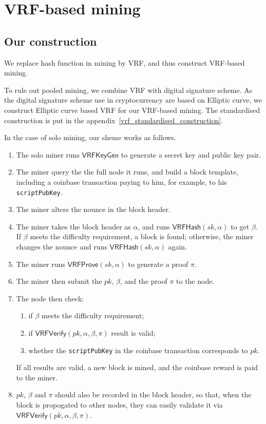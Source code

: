\section{VRF-based mining}

\subsection{Our construction}

We replace hash function in mining by VRF, and thus construct VRF-based mining.

To rule out pooled mining, we combine VRF with digital signature scheme.
As the digital signature scheme use in cryptocurrency are based on Elliptic curve, we construct Elliptic curve based VRF for our VRF-based mining.
The standardised construction is put in the appendix~\ref{vrf_standardised_construction}.


In the case of solo mining, our sheme works as follows.

\begin{enumerate}
    \item The solo miner runs $\mathsf{VRFKeyGen}$ to generate a secret key and public key pair.
    \item The miner query the the full node it runs, and build a block template, including a coinbase transaction paying to him, for example, to his \texttt{scriptPubKey}.
    \item The miner alters the nounce in the block header.
    \item The miner takes the block header as $\alpha$, and runs $\mathsf{VRFHash}(sk, \alpha)$ to get $\beta$. If $\beta$ meets the difficulty requirement, a block is found; otherwise, the miner changes the nounce and runs $\mathsf{VRFHash}(sk, \alpha)$ again.
    \item The miner runs $\mathsf{VRFProve}(sk, \alpha)$ to generate a proof $\pi$.
    \item The miner then submit the $pk$, $\beta$, and the proof $\pi$ to the node.
    \item The node then check:
        \begin{enumerate}
            \item if $\beta$ meets the difficulty requirement;
            \item if $\mathsf{VRFVerify}(pk, \alpha, \beta, \pi)$ result is valid;
            \item whether the \texttt{scriptPubKey} in the coinbase transaction corresponds to $pk$.
        \end{enumerate}
        If all results are valid, a new block is mined, and the coinbase reward is paid to the miner.
    \item $pk$, $\beta$ and $\pi$ should also be recorded in the block header, so that, when the block is propogated to other nodes, they can easily validate it via $\mathsf{VRFVerify}(pk, \alpha, \beta, \pi)$.
\end{enumerate}

